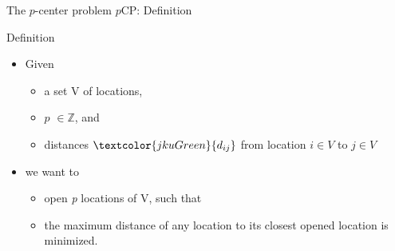 \documentclass[utf8,aspectratio=169,ngerman,english]{beamer}
\renewcommand{\emph}[1]{\textcolor{jkuGreen}{#1}}
\newcommand{\pCP}{$p$CP\xspace}
\newcommand{\npCP}{n-$p$CP\xspace}
\begin{document}
\begin{frame}{The $p$-center problem \pCP: Definition}
    \begin{block}{Definition}
        \begin{itemize}
            \item Given \pause
                  \begin{itemize}
                      \item a set V of locations, \pause
                      \item \emph{$p$} $\in \mathbb{Z}$, and \pause
                      \item \emph{distances} $\emph{d_{ij}}$ from location $i \in V$ to $j \in V$ \pause
                  \end{itemize}
            \item we want to
                  \begin{itemize}
                      \item \emph{open \textit{p} locations} of V, such that \pause
                      \item the \emph{maximum distance} of any location to its closest opened location is \emph{minimized}.
                  \end{itemize}
        \end{itemize}
    \end{block}
\end{frame}
\end{document}

